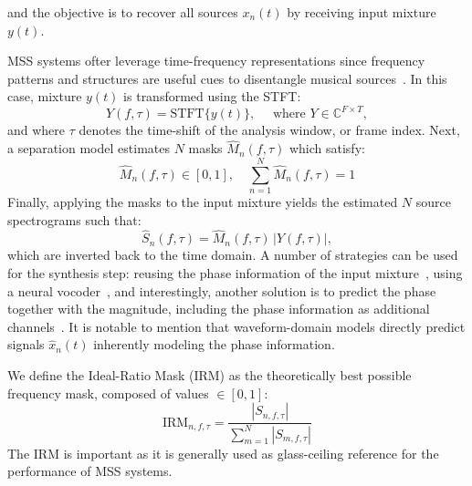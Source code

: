 and the objective is to recover all sources $x_n(t)$ by receiving input mixture $y(t)$. 

\acrshort{MSS} systems ofter leverage time-frequency representations since frequency patterns and structures are useful cues to disentangle musical sources~\citep{jansson-unet}. In this case, mixture $y(t)$ is transformed using the \acrshort{STFT}:
\begin{equation}
    Y(f,\tau) = \mathrm{STFT}\{y(t)\}, \quad \text{ where } Y \in \mathbb{C}^{F \times T},
\end{equation}
and where $\tau$ denotes the time-shift of the analysis window, or frame index.
Next, a separation model estimates $N$ masks $\hat{M}_n(f,\tau)$ which satisfy:
\begin{equation}
    \hat{M}_n(f,\tau) \in [0,1], \quad \sum_{n=1}^N \hat{M}_n(f,\tau) = 1
\end{equation}
Finally, applying the masks to the input mixture yields the estimated $N$ source spectrograms such that:
\begin{equation}
    \hat{S}_n(f,\tau) = \hat{M}_n(f,\tau)\,|Y(f,\tau)|,
\end{equation}
which are inverted back to the time domain. A number of strategies can be used for the synthesis step: reusing the phase information of the input mixture~\citep{jansson-unet}, using a neural vocoder~\citep{kong-hifigan}, and interestingly, another solution is to predict the phase together with the magnitude, including the phase information as additional channels~\citep{choi-cac}.
%
%
It is notable to mention that waveform-domain models directly predict signals $\hat{x}_n(t)$ inherently modeling the phase information.

We define the Ideal-Ratio Mask (IRM) as the theoretically best possible frequency mask, composed of values $\in[0, 1]$:
\begin{equation}
    \text{IRM}_{n,f,\tau} = \frac{|S_{n,f,\tau}|}{\sum_{m=1}^{N} |S_{m,f,\tau}|}
\end{equation}
The IRM is important as it is generally used as glass-ceiling reference for the performance of \acrshort{MSS} systems.

